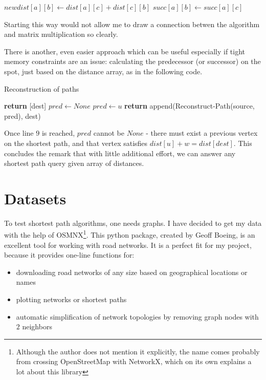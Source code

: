 \documentclass[12pt,a4paper,twoside,openright]{report}
\begin{document}
\begin{algorithm}
\begin{algorithmic}[1]
        \State $newdist[a][b] \gets dist[a][c] + dist[c][b]$
        \State $succ[a][b] \gets succ[a][c]$
    \EndIf
\end{algorithmic}
\end{algorithm}
Starting this way would not allow me to draw a connection betwen the algorithm and matrix multiplication so clearly.

There is another, even easier approach which can be useful especially if tight memory constraints are an issue: calculating the predecessor (or successor) on the spot, just based on the distance array, as in the following code.

\begin{algorithm}
\caption{Reconstruction of paths}\label{pathrec}
\begin{algorithmic}[1]
\State \textbf{return} [dest]
\Else
    \State $pred \gets None$
    \State $pred \gets u$
    \EndIf
    \EndFor
    \State \textbf{return} append(Reconstruct-Path(source, pred), dest)
\EndIf
\EndProcedure
\end{algorithmic}
\end{algorithm}

Once line $9$ is reached, $pred$ cannot be $None$ - there must exist a previous vertex on the shortest path, and that vertex satisfies $dist[u] + w = dist[dest]$. This concludes the remark that with little additional effort, we can answer any shortest path query given array of distances.

\section{Datasets}
To test shortest path algorithms, one needs graphs. I have decided to get my data with the help of OSMNX\cite{Boeing2017}\footnote{Although the author does not mention it explicitly, the name comes probably from crossing OpenStreetMap with NetworkX, which on its own explains a lot about this library}. This python package, created by Geoff Boeing, is an excellent tool for working with road networks. It is a perfect fit for my project, because it provides one-line functions for:
\begin{itemize}
    \item downloading road networks of any size based on geographical locations or names
    \item plotting networks or shortest paths
    \item automatic simplification of network topologies by removing graph nodes with $2$ neighbors
\end{itemize} 
\end{document}
